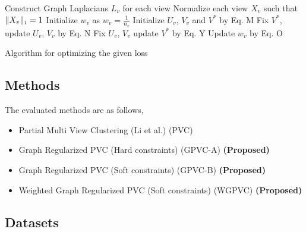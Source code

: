 \documentclass[a4paper]{article}
\begin{document}
	\begin{algorithm}
		Construct Graph Laplacians $L_{v}$ for each view\;
		Normalize each view $X_{v}$ such that $\|X_{v}\|_{\text{\tiny1}} = 1 $\;
		Initialize $w_{v}$ as $w_{v}=${\tiny{${\frac{1}{n_{v}}}$}}\;
		Initialize  $U_{v}$, $V_{v}$ and $V^{*}$ by Eq. M\;
		{
			{
				{
					Fix $V^{*}$, update $U_{v}$, $V_{v}$ by Eq. N\;
				}
			}
			Fix $U_{v}$, $V_{v}$ update $V^{*}$ by Eq. Y\;		
			Update $w_{v}$ by Eq. O\;
		}						
		\caption{Algorithm for optimizing the given loss}
	\end{algorithm}

	\subsection{Methods}
	
	The evaluated methods are as follows,
	\begin{itemize}
	\item {Partial Multi View Clustering (Li et al.) (PVC)}
	\item {Graph Regularized PVC (Hard constraints) (GPVC-A)	\small\textbf{(Proposed)}}
	\item {Graph Regularized PVC (Soft constraints) (GPVC-B)	\small\textbf{(Proposed)}}
	\item {Weighted Graph Regularized PVC (Soft constraints) (WGPVC)	\small\textbf{(Proposed)}}
	\end{itemize}

	\subsection{Datasets}
	
\end{document}
